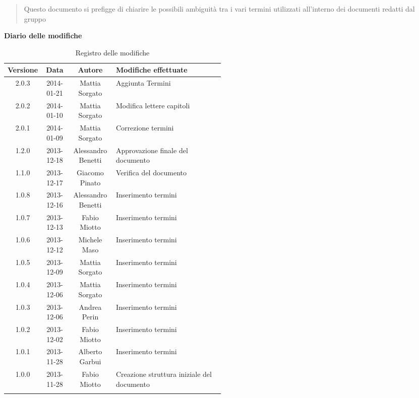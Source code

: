 \begin{abstract}
\begin{center}
Questo documento si prefigge di chiarire le possibili ambiguità tra i vari termini utilizzati all'interno dei documenti redatti dal gruppo \NomeGruppo{}
\end{center}
\end{abstract}

\newpage
\textbf{Diario delle modifiche}
\begin{center}
\begin{longtable}{|c|c|c|p{0.5\linewidth}|}
\toprule
\textbf{Versione} & \textbf{Data} & \textbf{Autore} & \textbf{Modifiche effettuate}\\
\midrule
2.0.3 & 2014-01-21 & Mattia Sorgato & Aggiunta Termini\\
\midrule
2.0.2 & 2014-01-10 & Mattia Sorgato & Modifica lettere capitoli\\
\midrule
2.0.1 & 2014-01-09 & Mattia Sorgato & Correzione termini\\
\midrule
1.2.0 & 2013-12-18 & Alessandro Benetti & Approvazione finale del documento\\
\midrule
1.1.0 & 2013-12-17 & Giacomo Pinato & Verifica del documento \\
\midrule
1.0.8 & 2013-12-16 & Alessandro Benetti & Inserimento termini\\
\midrule
1.0.7 & 2013-12-13 & Fabio Miotto & Inserimento termini\\
\midrule
1.0.6 & 2013-12-12 & Michele Maso & Inserimento termini\\
\midrule
1.0.5 & 2013-12-09 & Mattia Sorgato & Inserimento termini\\
\midrule
1.0.4 & 2013-12-06 & Mattia Sorgato & Inserimento termini \\
\midrule
1.0.3 & 2013-12-06 & Andrea Perin & Inserimento termini\\
\midrule
1.0.2 & 2013-12-02 & Fabio Miotto & Inserimento termini\\
\midrule
1.0.1 & 2013-11-28 & Alberto Garbui & Inserimento termini\\
\midrule
1.0.0 & 2013-11-28 & Fabio Miotto & Creazione struttura iniziale del documento\\


\bottomrule
\caption{Registro delle modifiche}
\label{tab:changelog}
\end{longtable}
\end{center}


